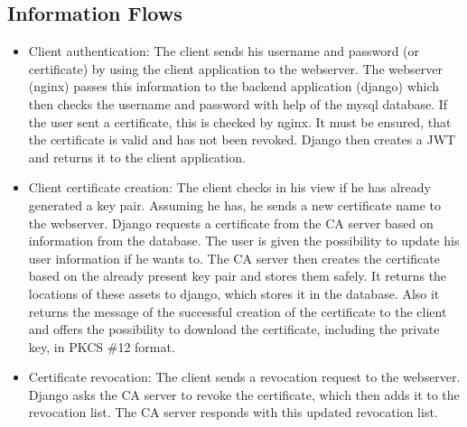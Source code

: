 \documentclass[english]{article}
\begin{document}
\subsection{Information Flows}


\begin{itemize}
	\item Client authentication: The client sends his username and password (or certificate) by using the client application to the webserver. The webserver (nginx) passes this information to the backend application (django) which then checks the username and password with help of the mysql database. If the user sent a certificate, this is checked by nginx. It must be ensured, that the certificate is valid and has not been revoked. Django then creates a JWT and returns it to the client application.
	
	\item Client certificate creation: The client checks in his view if he has already generated a key pair. Assuming he has, he sends a new certificate name to the webserver. Django requests a certificate from the CA server based on information from the database. The user is given the possibility to update his user information if he wants to. The CA server then creates the certificate based on the already present key pair and stores them safely. It returns the locations of these assets to django, which stores it in the database. Also it returns the message of the successful creation of the certificate to the client and offers the possibility to download the certificate, including the private key, in PKCS \#12 format.
	
	\item Certificate revocation: The client sends a revocation request to the webserver. Django asks the CA server to revoke the certificate, which then adds it to the revocation list. The CA server responds with  this updated revocation list.
\end{itemize}

\end{document}

